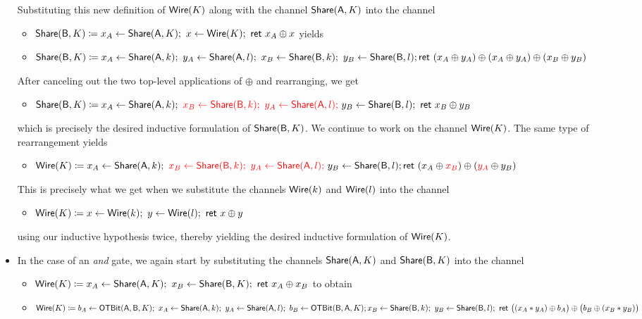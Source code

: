 \begin{itemize}
\begin{itemize}
\end{itemize}
Substituting this new definition of $\mathsf{Wire}(K)$ along with the channel $\mathsf{Share}(\mathsf{A},K)$ into the channel
\begin{itemize}
\item $\mathsf{Share}(\mathsf{B},K) \coloneqq x_A \leftarrow \mathsf{Share}(\mathsf{A},K); \ x \leftarrow \mathsf{Wire}(K); \ \mathsf{ret} \ x_A \oplus x$ yields
\item $\mathsf{Share}(\mathsf{B},K) \coloneqq x_A \leftarrow \mathsf{Share}(\mathsf{A},k); \ y_A \leftarrow \mathsf{Share}(\mathsf{A},l); \ x_B \leftarrow \mathsf{Share}(\mathsf{B},k); \ y_B \leftarrow \mathsf{Share}(\mathsf{B},l); \\ \mathsf{ret} \ (x_A \oplus y_A) \oplus (x_A \oplus y_A) \oplus (x_B \oplus y_B)$
\end{itemize}
After canceling out the two top-level applications of $\oplus$ and rearranging, we get
\begin{itemize}
\item $\mathsf{Share}(\mathsf{B},K) \coloneqq x_A \leftarrow \mathsf{Share}(\mathsf{A},k); \ {\color{red} x_B \leftarrow \mathsf{Share}(\mathsf{B},k); \ y_A \leftarrow \mathsf{Share}(\mathsf{A},l); \ } y_B \leftarrow \mathsf{Share}(\mathsf{B},l); \ \mathsf{ret} \ x_B \oplus y_B$
\end{itemize}
which is precisely the desired inductive formulation of $\mathsf{Share}(\mathsf{B},K)$. We continue to work on the channel $\mathsf{Wire}(K)$. The same type of rearrangement yields
\begin{itemize}
\item $\mathsf{Wire}(K) \coloneqq x_A \leftarrow \mathsf{Share}(\mathsf{A},k); \ {\color{red} x_B \leftarrow \mathsf{Share}(\mathsf{B},k); \ y_A \leftarrow \mathsf{Share}(\mathsf{A},l); \ } y_B \leftarrow \mathsf{Share}(\mathsf{B},l); \\ \mathsf{ret} \ (x_A \oplus {\color{red} x_B}) \oplus ({\color{red} y_A} \oplus y_B)$
\end{itemize}
This is precisely what we get when we substitute the channels $\mathsf{Wire}(k)$ and $\mathsf{Wire}(l)$ into the channel
\begin{itemize}
\item $\mathsf{Wire}(K) \coloneqq x \leftarrow \mathsf{Wire}(k); \ y \leftarrow \mathsf{Wire}(l); \ \mathsf{ret} \ x \oplus y$
\end{itemize}
using our inductive hypothesis twice, thereby yielding the desired inductive formulation of $\mathsf{Wire}(K)$.
\item In the case of an \emph{and} gate, we again start by substituting the channels $\mathsf{Share}(\mathsf{A},K)$ and $\mathsf{Share}(\mathsf{B},K)$ into the channel
\begin{itemize}
\item $\mathsf{Wire}(K) \coloneqq x_A \leftarrow \mathsf{Share}(\mathsf{A},K); \ x_B \leftarrow \mathsf{Share}(\mathsf{B},K); \ \mathsf{ret} \ x_A \oplus x_B$ to obtain  
\item $\mathsf{Wire}(K) \coloneqq b_A \leftarrow \mathsf{OTBit}(\mathsf{A},\mathsf{B},K); \ x_A \leftarrow \mathsf{Share}(\mathsf{A},k); \ y_A \leftarrow \mathsf{Share}(\mathsf{A},l); \ b_B \leftarrow \mathsf{OTBit}(\mathsf{B},\mathsf{A},K); \\ x_B \leftarrow \mathsf{Share}(\mathsf{B},k); \ y_B \leftarrow \mathsf{Share}(\mathsf{B},l); \ \mathsf{ret} \ \big((x_A * y_A) \oplus b_A\big) \oplus \big(b_B \oplus (x_B * y_B)\big)$

\end{itemize}
\end{itemize}
